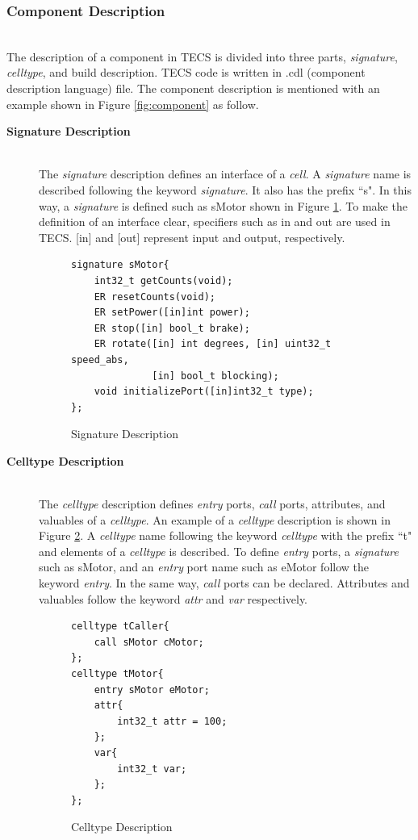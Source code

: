 \documentclass[conference,compsoc]{IEEEtran}
\begin{document}
\subsubsection{Component Description}\mbox{}\\

The description of a component in TECS is divided into three parts, {\it signature}, {\it celltype}, and build description.
TECS code is written in .cdl (component description language) file.
The component description is mentioned with an example shown in Figure \ref{fig:component} as follow.

\begin{description}
    \item[{\bf Signature Description}]\mbox{}\\
        The {\it signature} description defines an interface of a {\it cell}.
        A {\it signature} name is described following the keyword {\it signature}.
        It also has the prefix ``s".
        In this way, a {\it signature} is defined such as sMotor shown in Figure \ref{signature}.
        To make the definition of an interface clear, specifiers such as in and out are used in TECS.
        [in] and [out] represent input and output, respectively.\\
\begin{figure}[t]
\centering
\begin{lstlisting}
signature sMotor{
    int32_t getCounts(void);
    ER resetCounts(void);
    ER setPower([in]int power);
    ER stop([in] bool_t brake);
    ER rotate([in] int degrees, [in] uint32_t speed_abs,
              [in] bool_t blocking);
    void initializePort([in]int32_t type);
};
\end{lstlisting}
\caption{Signature Description}
\label{signature}
\end{figure}

    \item[{\bf Celltype Description}]\mbox{}\\
        The {\it celltype} description defines {\it entry} ports, {\it call} ports, attributes, and valuables of a {\it celltype}.
        An example of a {\it celltype} description is shown in Figure \ref{celltype}.
        A {\it celltype} name following the keyword {\it celltype} with the prefix ``t" and elements of a {\it celltype} is described.
        To define {\it entry} ports, a {\it signature} such as sMotor, and an {\it entry} port name such as eMotor follow the keyword {\it entry}.
        In the same way, {\it call} ports can be declared.
        Attributes and valuables follow the keyword {\it attr} and {\it var} respectively.\\
\begin{figure}[t]
\centering
\begin{lstlisting}
celltype tCaller{
    call sMotor cMotor;
};
celltype tMotor{
    entry sMotor eMotor;
    attr{
        int32_t attr = 100;
    };
    var{
        int32_t var;
    };
};
\end{lstlisting}
\caption{Celltype Description}
\label{celltype}
\end{figure}


\end{description}
\end{document}
